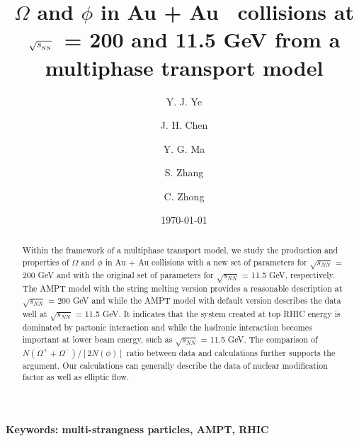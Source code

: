 \documentclass[twocolumn,aps,prc,showpacs,superscriptaddress,preprintnumbers,floatfix,nofootinbib]{revtex4}
\newcommand{ \srt  }{$\sqrt{s_{_{\rm NN}}}$}
\begin{document}
\begin{CJK*}{GBK}{song}

\title{$\Omega$ and $\phi$ in Au + Au ~collisions at \srt~= 200 and 11.5 GeV from a multiphase transport model}
\author{Y. J. Ye}
\author{J. H. Chen}
\author{Y. G. Ma}
\author{S. Zhang}
\author{C. Zhong}

\date{\today}

\begin{abstract}

Within the framework of a multiphase transport model, we study the production and properties of $\Omega$ and $\phi$ in Au + Au collisions with a new set of parameters for $\sqrt{s_{NN}}$ = 200 GeV and with the original set of parameters for $\sqrt{s_{NN}}$ = 11.5 GeV, respectively. The AMPT model with the string melting version provides a reasonable description at $\sqrt{s_{NN}}$ = 200 GeV and while the AMPT model with default version describes the data well at $\sqrt{s_{NN}}$ = 11.5 GeV. It indicates that the system created at top RHIC energy is dominated by partonic interaction and while the hadronic interaction becomes important at lower beam energy, such as $\sqrt{s_{NN}}$ = 11.5 GeV. The comparison of $N(\Omega ^++\Omega^-)/[2N(\phi)]$ ratio between data and calculations further supports the argument. Our calculations can generally describe the data of nuclear modification factor as well as elliptic flow.
\end{abstract}


\maketitle
\textbf{Keywords: multi-strangness particles, AMPT, RHIC}




\end{CJK*}
\end{document}
